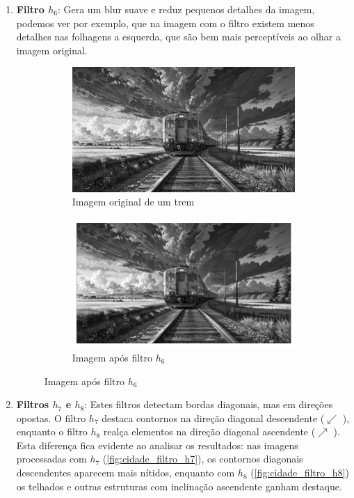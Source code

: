 \documentclass[12pt,a4paper]{report}
\begin{document}
\begin{enumerate}
\begin{figure}[H]
\begin{subfigure}{0.6\textwidth}
        \caption{Imagem da cidade com filtro $h_5$}
      \end{subfigure}
    \end{figure}
    \item \textbf{Filtro $h_6$}: Gera um blur suave e reduz pequenos detalhes da imagem, podemos ver por exemplo, que na imagem com o filtro existem menos detalhes nas folhagens a esquerda, que são bem mais perceptíveis ao olhar a imagem original.
    \begin{figure}[H]
      \centering
      \begin{subfigure}{0.8\textwidth}
        \includegraphics[width=\linewidth]{imagens/train_original.png}
        \caption{Imagem original de um trem}
      \end{subfigure}
      \begin{subfigure}{0.8\textwidth}
        \includegraphics[width=\linewidth]{imagens/ex10-06.png}
        \caption{Imagem após filtro $h_6$}
      \end{subfigure}
    \end{figure}
    \item \textbf{Filtros $h_7$ e $h_8$}: Estes filtros detectam bordas diagonais, mas em direções opostas. O filtro $h_7$ destaca contornos na direção diagonal descendente ($\swarrow$ ), enquanto o filtro $h_8$ realça elementos na direção diagonal ascendente ($\nearrow$ ). Esta diferença fica evidente ao analisar os resultados: nas imagens processadas com $h_7$ (\autoref{fig:cidade_filtro_h7}), os contornos diagonais descendentes aparecem mais nítidos, enquanto com $h_8$ (\autoref{fig:cidade_filtro_h8}) os telhados e outras estruturas com inclinação ascendente ganham destaque.

\end{enumerate}
\end{document}

